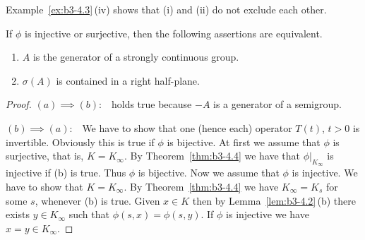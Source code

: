 Example~\ref{ex:b3-4.3}\,(iv) shows that (i) and (ii) do not exclude each other.
\begin{corollary}\label{cor:b3-4.5}
	If\/ $\phi$ is injective or surjective, then the following assertions are equivalent.
	\begin{enumerate}[\upshape (a)]
		\item 
		$A$ is the generator of a strongly continuous group.
		
		\item 
		$\sigma(A)$ is contained in a right half-plane.
	\end{enumerate}
\end{corollary}
\begin{proof}
	$(a)\implies(b)$:\ \  holds true because $-A$ is a generator of a semigroup.
	
	$(b)\implies(a)$:\ \ 
	We have to show that one (hence each) operator $T(t)$, $t > 0$ is invertible.
	Obviously this is true if\/ $\phi$ is bijective.
	At first we assume that $\phi$ is surjective, that is, $K = K_{\infty}$.
	By Theorem~\ref{thm:b3-4.4} we have that $\phi|_{K_{\infty}}$ is injective if (b) is true.
	Thus $\phi$ is bijective.
	Now we assume that $\phi$ is injective.
	We have to show that $K = K_{\infty}$.
	By Theorem~\ref{thm:b3-4.4} we have $K_{\infty} = K_{s}$ for some $s$, whenever (b) is true.
	Given $x \in K$ then by Lemma~\ref{lem:b3-4.2}\,(b) there exists $y \in K_{\infty}$ such that $\phi(s,x) = \phi(s,y)$.
	If\/ $\phi$ is injective we have $x = y \in K_{\infty}$.
\end{proof}
